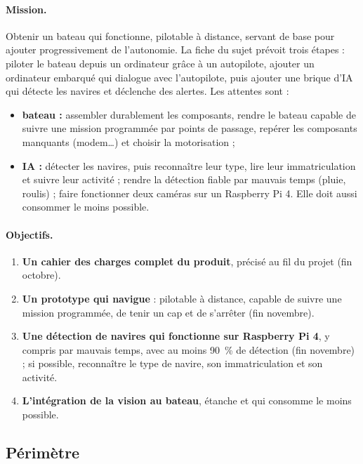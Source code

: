 \paragraph{Mission.} Obtenir un bateau qui fonctionne, pilotable à distance, servant de base pour ajouter progressivement de l'autonomie. La fiche du sujet prévoit trois étapes : piloter le bateau depuis un ordinateur grâce à un autopilote, ajouter un ordinateur embarqué qui dialogue avec l'autopilote, puis ajouter une brique d'IA qui détecte les navires et déclenche des alertes. Les attentes sont :
\begin{itemize}
  \item \textbf{bateau :} assembler durablement les composants, rendre le bateau capable de suivre une mission programmée par points de passage, repérer les composants manquants (modem…) et choisir la motorisation ;
  \item \textbf{IA :} détecter les navires, puis reconnaître leur type, lire leur immatriculation et suivre leur activité ; rendre la détection fiable par mauvais temps (pluie, roulis) ; faire fonctionner deux caméras sur un Raspberry Pi 4. Elle doit aussi consommer le moins possible.
\end{itemize}

\paragraph{Objectifs.}
\begin{enumerate}
  \item \textbf{Un cahier des charges complet du produit}, précisé au fil du projet (fin octobre).
  \item \textbf{Un prototype qui navigue} : pilotable à distance, capable de suivre une mission programmée, de tenir un cap et de s'arrêter (fin novembre).
  \item \textbf{Une détection de navires qui fonctionne sur Raspberry Pi 4}, y compris par mauvais temps, avec au moins 90~\% de détection (fin novembre) ; si possible, reconnaître le type de navire, son immatriculation et son activité.
  \item \textbf{L'intégration de la vision au bateau}, étanche et qui consomme le moins possible.
  \\
\end{enumerate}

\subsection{Périmètre}
\label{sec:perimetre}

